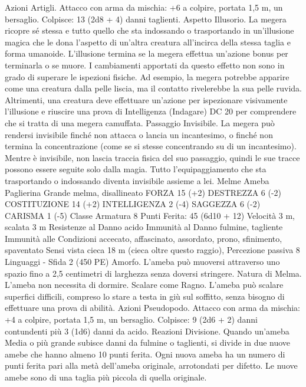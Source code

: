\begin{multicols}{2}
Azioni
Artigli. Attacco con arma da mischia: +6 a colpire, portata 1,5
m, un bersaglio.
Colpisce: 13 (2d8 + 4) danni taglienti.
Aspetto Illusorio. La megera ricopre sé stessa e tutto quello che
sta indossando o trasportando in un’illusione magica che le dona
l’aspetto di un’altra creatura all’incirca della stessa taglia e forma
umanoide. L’illusione termina se la megera effettua un’azione
bonus per terminarla o se muore.
I cambiamenti apportati da questo effetto non sono in grado di
superare le ispezioni fisiche. Ad esempio, la megera potrebbe
apparire come una creatura dalla pelle liscia, ma il contatto
rivelerebbe la sua pelle ruvida. Altrimenti, una creatura deve
effettuare un’azione per ispezionare visivamente l’illusione e
riuscire una prova di Intelligenza (Indagare) DC 20 per
comprendere che si tratta di una megera camuffata.
Passaggio Invisibile. La megera può rendersi invisibile finché
non attacca o lancia un incantesimo, o finché non termina la
concentrazione (come se si stesse concentrando su di un
incantesimo). Mentre è invisibile, non lascia traccia fisica del suo
passaggio, quindi le sue tracce possono essere seguite solo dalla
magia. Tutto l’equipaggiamento che sta trasportando o
indossando diventa invisibile assieme a lei.
Melme
Ameba Paglierina
Grande melma, disallineato
FORZA 15 (+2)
DESTREZZA 6 (-2)
COSTITUZIONE 14 (+2)
INTELLIGENZA 2 (-4)
SAGGEZZA 6 (-2)
CARISMA 1 (-5)
Classe Armatura 8
\hspace*{0pt}\hfill{Punti Ferita}: 45 (6d10 + 12)
Velocità 3 m, scalata 3 m
Resistenze al Danno acido
Immunità al Danno fulmine, tagliente
Immunità alle Condizioni accecato, affascinato, assordato,
prono, sfinimento, spaventato
Sensi vista cieca 18 m (cieca oltre questo raggio), Percezione
passiva 8
Linguaggi -
Sfida 2 (450 PE)
Amorfo. L’ameba può muoversi attraverso uno spazio fino a 2,5
centimetri di larghezza senza doversi stringere.
Natura di Melma. L’ameba non necessita di dormire.
Scalare come Ragno. L’ameba può scalare superfici difficili,
compreso lo stare a testa in giù sul soffitto, senza bisogno di
effettuare una prova di abilità.
Azioni
Pseudopodo. Attacco con arma da mischia: +4 a colpire, portata
1,5 m, un bersaglio.
Colpisce: 9 (2d6 + 2) danni contundenti più 3 (1d6) danni da acido.
Reazioni
Divisione. Quando un’ameba Media o più grande subisce danni da
fulmine o taglienti, si divide in due nuove amebe che hanno almeno
10 punti ferita. Ogni nuova ameba ha un numero di punti ferita pari
alla metà dell’ameba originale, arrotondati per difetto. Le nuove
amebe sono di una taglia più piccola di quella originale.

\end{multicols}
